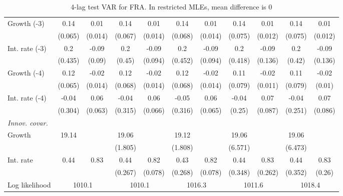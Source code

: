 \begin{table}[htbp]
\begin{tabular}{@{\extracolsep{4pt}}lcccccccccc@{}}
\quad Growth (-3) 	 &0.14 	 & 0.01 	 & 0.14 	 & 0.01 	 & 0.14 	 & 0.01 	 & 0.14 	 & 0.01 	 & 0.14 	 & 0.01	 \\ 
 		 & (0.065) 	 & (0.014) 	 & (0.067) 	 & (0.014) 	 & (0.068) 	 & (0.014) 	 & (0.075) 	 & (0.012) 	 & (0.075) 	 & (0.012) 	 \\ 
\quad Int. rate (-3) 	 &0.2 	 & -0.09 	 & 0.2 	 & -0.09 	 & 0.2 	 & -0.09 	 & 0.2 	 & -0.09 	 & 0.2 	 & -0.09	 \\ 
 		 & (0.435) 	 & (0.09) 	 & (0.45) 	 & (0.094) 	 & (0.452) 	 & (0.094) 	 & (0.418) 	 & (0.136) 	 & (0.42) 	 & (0.136) 	 \\ 
\quad Growth (-4) 	 &0.12 	 & -0.02 	 & 0.12 	 & -0.02 	 & 0.12 	 & -0.02 	 & 0.11 	 & -0.02 	 & 0.11 	 & -0.02	 \\ 
 		 & (0.065) 	 & (0.014) 	 & (0.068) 	 & (0.014) 	 & (0.068) 	 & (0.014) 	 & (0.079) 	 & (0.011) 	 & (0.079) 	 & (0.01) 	 \\ 
\quad Int. rate (-4) 	 &-0.04 	 & 0.06 	 & -0.04 	 & 0.06 	 & -0.05 	 & 0.06 	 & -0.04 	 & 0.07 	 & -0.04 	 & 0.07	 \\ 
 		 & (0.304) 	 & (0.063) 	 & (0.315) 	 & (0.066) 	 & (0.316) 	 & (0.065) 	 & (0.25) 	 & (0.087) 	 & (0.251) 	 & (0.086) 	 \\ 
\rule{0pt}{4ex} \emph{Innov. covar.}  	 & 	 & 	 & 	 & 	 & 	 & 	 & 	 & 	 & 	 &\\ 
\quad Growth 	 &19.14 	 &  	 & 19.06 	 &  	 & 19.12 	 &  	 & 19.06 	 &  	 & 19.06 	 & 	 \\ 
 		 &  	 &  	 & (1.805) 	 &  	 & (1.808) 	 &  	 & (6.571) 	 &  	 & (6.473) 	 &  	 \\ 
\quad Int. rate 	 &0.44 	 & 0.83 	 & 0.44 	 & 0.82 	 & 0.43 	 & 0.82 	 & 0.44 	 & 0.83 	 & 0.44 	 & 0.83	 \\ 
 		 &  	 &  	 & (0.267) 	 & (0.078) 	 & (0.268) 	 & (0.078) 	 & (0.348) 	 & (0.262) 	 & (0.352) 	 & (0.26) 	 \\ 
 \hline \rule{0pt}{4ex} 
  Log likelihood 	 &\multicolumn{2}{c}{1010.1} 	 & \multicolumn{2}{c}{1010.1} 	 & \multicolumn{2}{c}{1016.3} 	 & \multicolumn{2}{c}{1011.6} 	 & \multicolumn{2}{c}{1018.4}\\ 

 \hline 	\end{tabular}		\caption{4-lag test VAR for FRA. In restricted MLEs, mean difference is 0}
		\label{tab:FRA4lag}

\end{table}
